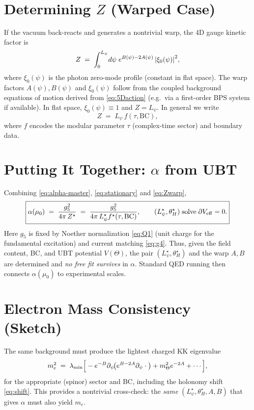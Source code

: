\documentclass[12pt]{article}
\begin{document}
\section{Determining $Z$ (Warped Case)}
If the vacuum back-reacts and generates a nontrivial warp, the 4D gauge kinetic factor is
\begin{equation}
Z \;=\; \int_0^{L_\psi}\! d\psi\; e^{B(\psi)-2A(\psi)}\, \abs{\xi_0(\psi)}^2,
\label{eq:Zwarp}
\end{equation}
where $\xi_0(\psi)$ is the photon zero-mode profile (constant in flat space).
The warp factors $A(\psi),B(\psi)$ and $\xi_0(\psi)$ follow from the coupled background equations of motion
derived from \eqref{eq:5Daction} (e.g.\ via a first-order BPS system if available).
In flat space, $\xi_0(\psi)\equiv 1$ and $Z=L_\psi$. In general we write
\begin{equation}
Z \;=\; L_\psi \, f(\tau,\mathrm{BC}) ,
\end{equation}
where $f$ encodes the modular parameter $\tau$ (complex-time sector) and boundary data.

\section{Putting It Together: $\alpha$ from UBT}
Combining \eqref{eq:alpha-master}, \eqref{eq:stationary} and \eqref{eq:Zwarp},
\begin{equation}
\boxed{
\alpha(\mu_0) \;=\; \frac{g_5^2}{4\pi \, Z^\star}
\;=\; \frac{g_5^2}{4\pi \, L_\psi^\star f^\star(\tau,\mathrm{BC})},
\qquad
(L_\psi^\star,\theta_H^\star)\; \text{solve}\; \partial V_{\rm eff}=0.}
\end{equation}
Here $g_5$ is fixed by Noether normalization \eqref{eq:Q1} (unit charge for the fundamental excitation) and current matching \eqref{eq:g4}.
Thus, given the field content, BC, and UBT potential $V(\Theta)$, the pair $(L_\psi^\star,\theta_H^\star)$ and the warp $A,B$ are determined
and \emph{no free fit survives} in $\alpha$. Standard QED running then connects $\alpha(\mu_0)$ to experimental scales.

\section{Electron Mass Consistency (Sketch)}
The same background must produce the lightest charged KK eigenvalue
\begin{equation}
m_e^2 \;=\; \lambda_{\rm min}\Big[ -e^{-B}\partial_\psi\!\big( e^{B-2A}\partial_\psi \cdot \big) + m_\Theta^2 e^{-2A} + \cdots \Big],
\end{equation}
for the appropriate (spinor) sector and BC, including the holonomy shift \eqref{eq:shift}.
This provides a nontrivial cross-check: the \emph{same} $(L_\psi^\star,\theta_H^\star, A,B)$ that gives $\alpha$ must also yield $m_e$.
\end{document}
